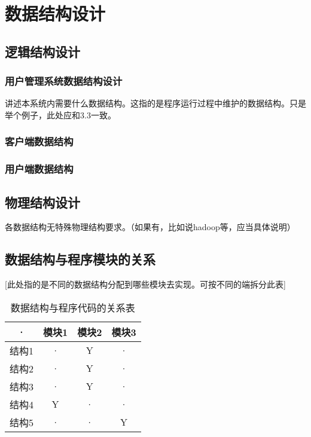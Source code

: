 \chapter{数据结构设计}
\section{逻辑结构设计}
\subsection{用户管理系统数据结构设计}
讲述本系统内需要什么数据结构。这指的是程序运行过程中维护的数据结构。只是举个例子，此处应和3.3一致。
\subsection{客户端数据结构}

\subsection{用户端数据结构}

\section{物理结构设计}
各数据结构无特殊物理结构要求。（如果有，比如说hadoop等，应当具体说明）

\section{数据结构与程序模块的关系}
[此处指的是不同的数据结构分配到哪些模块去实现。可按不同的端拆分此表]
\begin{table}[htbp]
\centering
\caption{数据结构与程序代码的关系表} \label{tab:datastructure-module}
\begin{tabular}{|c|c|c|c|}
    \hline
    · & 模块1 & 模块2 & 模块3 \\
    \hline
    结构1 & · & Y & · \\
    \hline
    结构2 & · & Y & · \\
    \hline
    结构3 & · & Y & · \\
    \hline
    结构4 & Y & · & · \\
    \hline
    结构5 & · & · & Y \\
    \hline
\end{tabular}
\end{table}